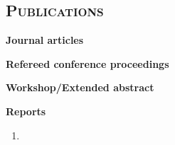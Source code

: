 \documentclass[margin,10pt]{res} %
\begin{document}
\begin{resume}
\section{\textnormal{\textsc{Publications}}} 
\noindent\textbf{Journal articles}\\
\begin{enumerate}[1.]%

\end{enumerate}
\clearpage
\noindent\textbf{Refereed conference proceedings}\\
\begin{enumerate}[1.]%

\end{enumerate}
\noindent\textbf{Workshop/Extended abstract}\\
\begin{enumerate}[1.]%

\end{enumerate}
\noindent\textbf{Reports}\\
\begin{enumerate}[1.]
\item {}
\end{enumerate}
%

\end{resume}
\end{document}
